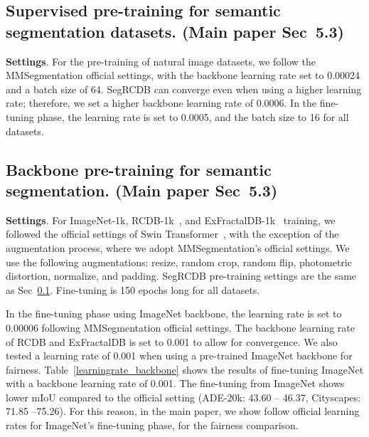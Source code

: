 \documentclass[10pt,twocolumn,letterpaper]{article}
\begin{document}
\subsection{Supervised pre-training for semantic segmentation
datasets. (Main paper Sec~5.3)}
\label{sec:semseg}

\textbf{Settings}.
For the pre-training of natural image datasets, we follow the MMSegmentation official settings, with the backbone learning rate set to 0.00024 and a batch size of 64.
SegRCDB can converge even when using a higher learning rate; therefore, we set a higher backbone learning rate of 0.0006. In the fine-tuning phase, the learning rate is set to 0.0005, and the batch size to 16 for all datasets. 

\subsection{Backbone pre-training for semantic segmentation. (Main paper Sec~5.3)}

\textbf{Settings}.
For ImageNet-1k, RCDB-1k~\cite{Kataoka_2022_CVPR}, and ExFractalDB-1k~\cite{Kataoka_2022_CVPR} training, we followed the official settings of Swin Transformer~\cite{liu2021Swin}, with the exception of the augmentation process, where we adopt MMSegmentation's official settings.  We use the following augmentations: resize, random crop, random flip, photometric distortion, normalize, and padding. SegRCDB pre-training settings are the same as Sec~\ref{sec:semseg}. Fine-tuning is 150 epochs long for all datasets. 

In the fine-tuning phase using ImageNet backbone, the learning rate is set to 0.00006 following MMSegmentation official settings. The backbone learning rate of RCDB and ExFractalDB is set to 0.001 to allow for convergence. 
We also tested a learning rate of 0.001 when using a pre-trained ImageNet backbone for fairness. Table~\ref{learningrate_backbone} shows the results of fine-tuning ImageNet with a backbone learning rate of 0.001.  The fine-tuning from ImageNet shows lower mIoU compared to the official setting (ADE-20k: 43.60 -- 46.37, Cityscapes: 71.85 --75.26). For this reason, in the main paper, we show follow official learning rates for ImageNet's fine-tuning phase, for the fairness comparison.
\end{document}
